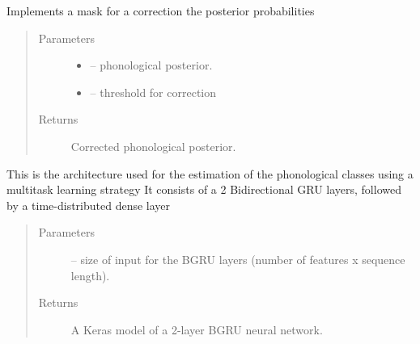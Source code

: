 \documentclass[letterpaper,10pt,english]{sphinxmanual}
\begin{document}
\begin{fulllineitems}
\begin{fulllineitems}
\end{fulllineitems}


\begin{fulllineitems}
\label{\detokenize{index:phonet.Phonet.mask_correction}}
Implements a mask for a correction the posterior probabilities
\begin{quote}\begin{description}
\item[{Parameters}] \leavevmode\begin{itemize}
\item {} 
 -- phonological posterior.

\item {} 
 -- threshold for correction

\end{itemize}

\item[{Returns}] \leavevmode
Corrected phonological posterior.

\end{description}\end{quote}

\end{fulllineitems}


\begin{fulllineitems}
\label{\detokenize{index:phonet.Phonet.model}}
This is the architecture used for the estimation of the phonological classes using a multitask learning strategy
It consists of a 2 Bidirectional GRU layers, followed by a time-distributed dense layer
\begin{quote}\begin{description}
\item[{Parameters}] \leavevmode
{} -- size of input for the BGRU layers (number of features x sequence length).

\item[{Returns}] \leavevmode
A Keras model of a 2-layer BGRU neural network.

\end{description}\end{quote}


\end{fulllineitems}
\end{fulllineitems}
\end{document}
